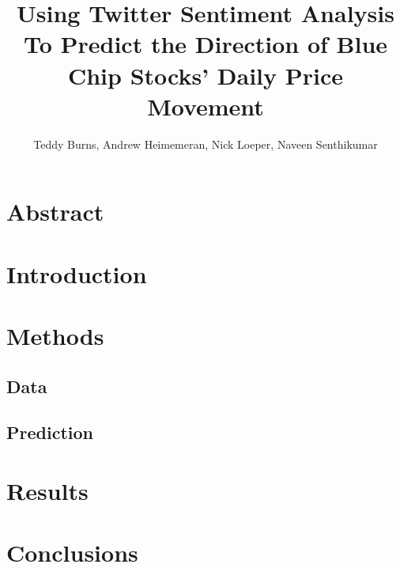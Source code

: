 \documentclass[11pt]{article}
\title{Using Twitter Sentiment Analysis To Predict the Direction of  Blue Chip Stocks' Daily Price Movement}
\author{Teddy Burns, Andrew Heimemeran, Nick Loeper, Naveen Senthikumar} %
\begin{document}
	\maketitle
	\pagebreak

	\tableofcontents
	
		\section{Abstract}

		\section{Introduction}

		\section{Methods}
			\subsection{Data}
			\subsection{Prediction}

		\section{Results}

		\section{Conclusions}
\end{document}
